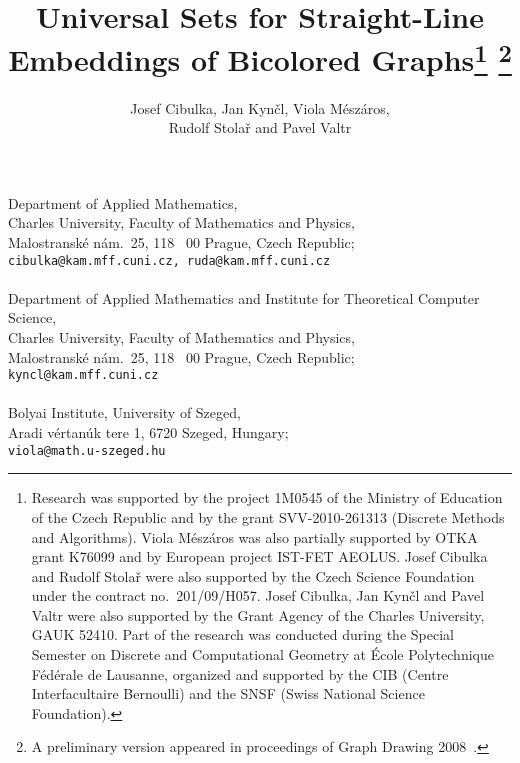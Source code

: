 \documentclass[12pt]{article}
\def\inst#1{}
\begin{document}
\title{Universal Sets for Straight-Line Embeddings of Bicolored Graphs\thanks{
Research was supported by the project 1M0545 of the Ministry of Education of the Czech Republic 
and by the grant SVV-2010-261313 (Discrete Methods and Algorithms).
Viola M\'{e}sz\'{a}ros was also partially supported by OTKA grant K76099
and by European project IST-FET AEOLUS.
Josef Cibulka and Rudolf Stola\v{r} were also 
supported by the Czech Science Foundation under the contract no.\ 201/09/H057.
Josef Cibulka, Jan Kyn\v{c}l and Pavel Valtr were also supported by the Grant Agency 
of the Charles University, GAUK 52410.
\newline 
Part of the research was conducted during the Special Semester on Discrete
and Computational Geometry at \'Ecole Polytechnique F\'ed\'erale de Lausanne, organized and
supported by the CIB (Centre Interfacultaire Bernoulli) and the SNSF (Swiss
National Science Foundation).
} \thanks{A preliminary version appeared in 
proceedings of Graph Drawing 2008~\cite{gdversion}.}} 
\author{Josef Cibulka\inst{1}, Jan Kyn\v{c}l\inst{2}, Viola M\'{e}sz\'{a}ros\inst{2,3}, \\
Rudolf Stola\v{r}\inst{1} and Pavel Valtr\inst{2}
} 
\date{}

\maketitle

\begin{center}
{\footnotesize
\inst{1} 
Department of Applied Mathematics, \\
Charles University, Faculty of Mathematics and Physics, \\
Malostransk\'e n\'am.~25, 118~ 00 Prague, Czech Republic; \\ 
\texttt{cibulka@kam.mff.cuni.cz, ruda@kam.mff.cuni.cz} 
\\\ \\
\inst{2}
Department of Applied Mathematics and Institute for Theoretical Computer Science, \\
Charles University, Faculty of Mathematics and Physics, \\
Malostransk\'e n\'am.~25, 118~ 00 Prague, Czech Republic; \\
\texttt{kyncl@kam.mff.cuni.cz}
\\\ \\
\inst{3}
Bolyai Institute, University of Szeged, \\
Aradi v\'ertan\'uk tere 1, 6720 Szeged, Hungary; \\
\texttt{viola@math.u-szeged.hu}
}
\end{center}  
\end{document}
